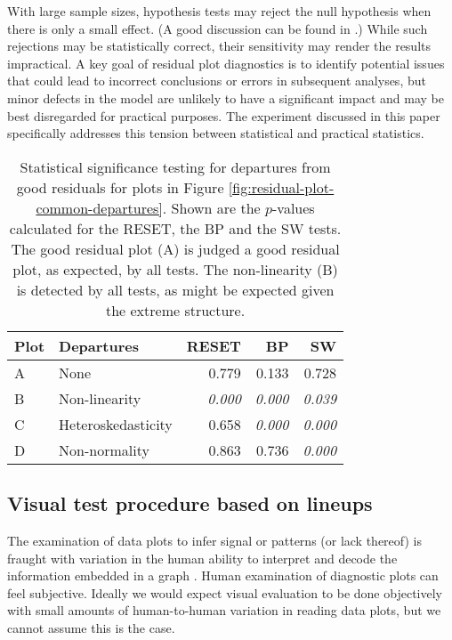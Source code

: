 \documentclass[]{interact}
\theoremstyle{plain}%
\theoremstyle{definition}
\theoremstyle{remark}
\begin{document}
With large sample sizes, hypothesis tests may reject the null hypothesis
when there is only a small effect. (A good discussion can be found in
\citet{kirk1996}.) While such rejections may be statistically correct,
their sensitivity may render the results impractical. A key goal of
residual plot diagnostics is to identify potential issues that could
lead to incorrect conclusions or errors in subsequent analyses, but
minor defects in the model are unlikely to have a significant impact and
may be best disregarded for practical purposes. The experiment discussed
in this paper specifically addresses this tension between statistical
and practical statistics.

\begin{table}

\caption{\label{tab:example-residual-plot-table}Statistical significance testing for departures from good residuals for plots in Figure \ref{fig:residual-plot-common-departures}. Shown are the $p$-values calculated for the RESET, the BP and the SW tests. The good residual plot (A) is judged a good residual plot, as expected, by all tests. The non-linearity (B) is detected by all tests, as might be expected given the extreme structure.}
\centering
\begin{tabular}[t]{llrrr}
\toprule
Plot & Departures & RESET & BP & SW\\
\midrule
A & None & 0.779 & 0.133 & 0.728\\
B & Non-linearity & \em{0.000} & \em{0.000} & \em{0.039}\\
C & Heteroskedasticity & 0.658 & \em{0.000} & \em{0.000}\\
D & Non-normality & 0.863 & 0.736 & \em{0.000}\\
\bottomrule
\end{tabular}
\end{table}

\hypertarget{visual-test-procedure-based-on-lineups}{%
\subsection{Visual test procedure based on
lineups}\label{visual-test-procedure-based-on-lineups}}

The examination of data plots to infer signal or patterns (or lack
thereof) is fraught with variation in the human ability to interpret and
decode the information embedded in a graph
\citep{cleveland_graphical_1984}. Human examination of diagnostic plots
can feel subjective. Ideally we would expect visual evaluation to be
done objectively with small amounts of human-to-human variation in
reading data plots, but we cannot assume this is the case.
\end{document}
